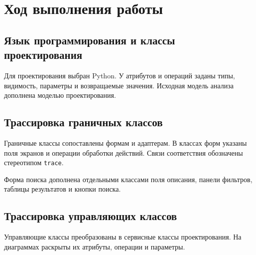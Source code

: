 \section{Ход выполнения работы}
\subsection{Язык программирования и классы проектирования}
Для проектирования выбран Python. У атрибутов и операций заданы
типы, видимость, параметры и возвращаемые значения.
Исходная модель анализа дополнена моделью проектирования.

\subsection{Трассировка граничных классов}
Граничные классы сопоставлены формам и адаптерам.
В классах форм указаны поля экранов и операции обработки действий.
Связи соответствия обозначены стереотипом \texttt{trace}.







Форма поиска дополнена отдельными классами поля описания, панели фильтров, таблицы результатов и кнопки поиска.


\subsection{Трассировка управляющих классов}
Управляющие классы преобразованы в сервисные классы проектирования.
На диаграммах раскрыты их атрибуты, операции и параметры.




